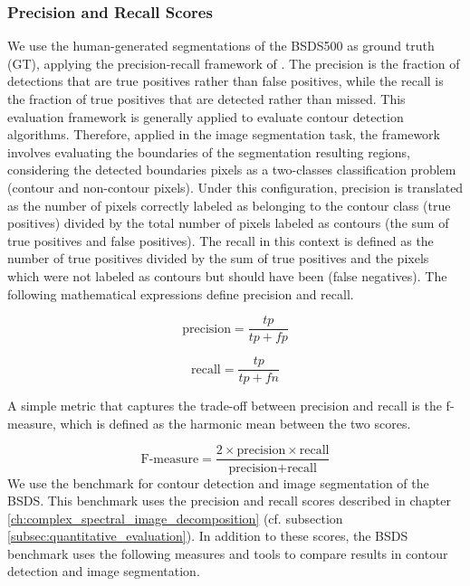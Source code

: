 \documentclass[journal]{IEEEtran}
\begin{document}
\subsubsection{Precision and Recall Scores}
We use the human-generated segmentations of the BSDS500 as ground truth (GT), applying the precision-recall framework of \cite{Martin.Fowlkes.ea:PAMI:2004}. The precision is the fraction of detections that are true positives rather than false positives, while the recall is the fraction of true positives that are detected rather than missed. This evaluation framework is generally applied to evaluate contour detection algorithms. Therefore, applied in the image segmentation task, the framework involves evaluating the boundaries of the segmentation resulting regions, considering the detected boundaries pixels as a two-classes classification problem (contour and non-contour pixels). Under this configuration, precision is translated as the number of pixels correctly labeled as belonging to the contour class (true positives) divided by the total number of pixels labeled as contours (the sum of true positives and false positives). The recall in this context is defined as the number of true positives divided by the sum of true positives and the pixels which were not labeled as contours but should have been (false negatives). The following mathematical expressions define precision and recall.

\begin{equation}\label{eq:precision_score}
    \text{precision} = \frac{tp}{tp+fp}
\end{equation}

\begin{equation}\label{eq:recall_score}
    \text{recall} = \frac{tp}{tp+fn}
\end{equation}

A simple metric that captures the trade-off between precision and recall is the f-measure, which is defined as the harmonic mean between the two scores.

\begin{equation}\label{eq:f_score}
    \text{F-measure} = \frac{2 \times \text{precision}\times\text{recall}}{\text{precision} + \text{recall}}
\end{equation}
We use the benchmark for contour detection and image segmentation of the BSDS. This benchmark uses the precision and recall scores described in chapter \ref{ch:complex_spectral_image_decomposition} (cf. subsection \ref{subsec:quantitative_evaluation}). In addition to these scores, the BSDS benchmark uses the following measures and tools to compare results in contour detection and image segmentation.
\end{document}
